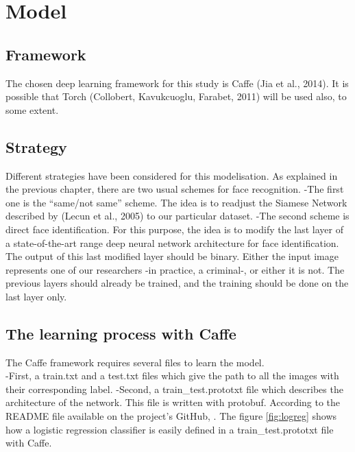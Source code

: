 \section{Model}

\subsection{Framework}
The chosen deep learning framework for this study is Caffe (Jia et al., 2014). It is possible that Torch (Collobert, Kavukcuoglu, Farabet, 2011) will be used also, to some extent.\\

\subsection{Strategy}
Different strategies have been considered for this modelisation. As explained in the previous chapter, there are two usual schemes for face recognition.\newline
-The first one is the \enquote{same/not same} scheme. The idea is to readjust the Siamese Network described by (Lecun et al., 2005) to our particular dataset.\newline
-The second scheme is direct face identification. For this purpose, the idea is to modify the last layer of a state-of-the-art range deep neural network architecture for face identification. The output of this last modified layer should be binary. Either the input image represents one of our researchers -in practice, a criminal-, or either it is not. The previous layers should already be trained, and the training should be done on the last layer only.

\subsection{The learning process with Caffe}

The Caffe framework requires several files to learn the model.\\
-First, a train.txt and a test.txt files which give the path to all the images with their corresponding label.\newline
-Second, a train\_test.prototxt file which describes the architecture of the network. This file is written with protobuf. According to the README file available on the project's GitHub, . The figure \ref{fig:logreg} shows how a logistic regression classifier is easily defined in a train\_test.prototxt file with Caffe.

